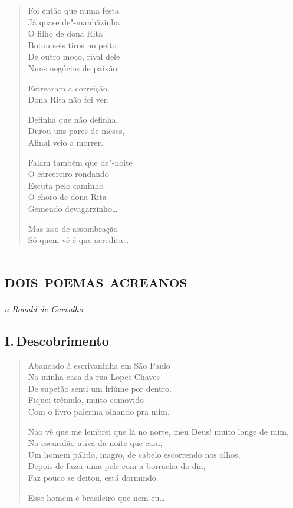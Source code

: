 \begin{verse}
Foi então que numa festa\\
Já quase de"-manhãzinha\\
O filho de dona Rita\\
Botou seis tiros no peito\\
De outro moço, rival dele\\
Nuns negócios de paixão.

Estrearam a correição.\\
Dona Rita não foi ver.

Definha que não definha,\\
Durou uns pares de meses,\\
Afinal veio a morrer.

Falam também que de"-noite\\
O carcereiro rondando\\
Escuta pelo caminho\\
O choro de dona Rita\\
Gemendo devagarzinho\ldots{}

Mas isso de assombração\\
Só quem vê é que acredita\ldots{}
\end{verse}

\chapter[\textsc{dois poemas acreanos}\\I.\,Descobrimento]{\textsc{dois poemas acreanos}}

\begin{flushright}
\emph{a Ronald de Carvalho}
\end{flushright}

\section*{I.\,Descobrimento}

\begin{verse}
Abancado à escrivaninha em São Paulo\\
Na minha casa da rua Lopes Chaves\\
De supetão senti um friúme por dentro.\\
Fiquei trêmulo, muito comovido\\
Com o livro palerma olhando pra mim.

Não vê que me lembrei que lá no norte, meu Deus! muito longe de mim,\\
Na escuridão ativa da noite que caiu,\\
Um homem pálido, magro, de cabelo escorrendo nos olhos,\\
Depois de fazer uma pele com a borracha do dia,\\
Faz pouco se deitou, está dormindo.

Esse homem é brasileiro que nem eu\ldots{}
\end{verse}

